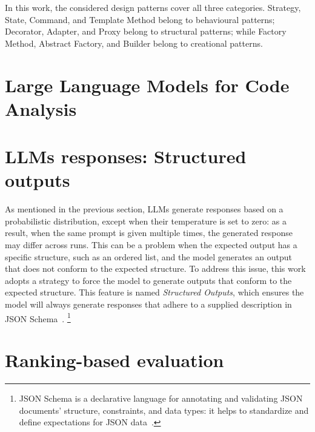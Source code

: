 In this work, the considered design patterns cover all three categories.
Strategy, State, Command, and Template Method
belong to behavioural patterns; Decorator, Adapter, and Proxy belong to structural patterns; while Factory Method,
Abstract Factory, and Builder belong to creational patterns.

\section{Large Language Models for Code Analysis}\label{sec:large-language-models-for-code}





\section{LLMs responses: Structured outputs}\label{sec:llms-responses-structured-outputs}
As mentioned in the previous section, LLMs generate responses based on a probabilistic distribution, except when
their temperature is set to zero: as a result, when the same prompt is given multiple times, the generated
response may differ across runs.
This can be a problem when the expected output has a specific structure, such as an
ordered list, and the model generates an output that does not conform to the expected structure.
To address this issue,
this work adopts a strategy to force the model to generate outputs that conform to the expected structure.
This feature is named \textit{Structured Outputs}, which ensures the model will always generate responses that
adhere to a supplied description in JSON Schema~\cite{openai_structured_outputs}. \footnote{JSON Schema is a declarative language
for annotating and validating JSON documents' structure, constraints, and data types: it helps to standardize and define
expectations for JSON data~\cite{json_schema}.}

\section{Ranking-based evaluation}\label{sec:ranking-based-evaluation}
